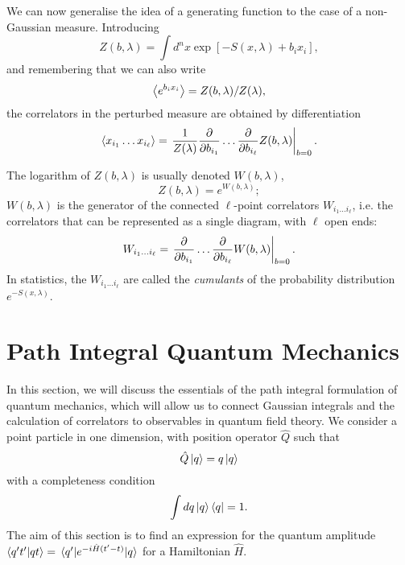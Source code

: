 \documentclass{article}
\numberwithin{equation}{section}
\begin{document}
We can now generalise the idea of a generating function to the case of a non-Gaussian measure. Introducing 
\begin{equation}
    Z(b, \lambda) = \int d^nx \exp[-S(x,\lambda) + b_i x_i],
\end{equation}
and remembering that we can also write
\begin{equation}
    \ev{e^{b_i x_i}} = Z(b, \lambda)/Z(\lambda),
\end{equation}
the correlators in the perturbed measure are obtained by differentiation
\begin{equation}
    \ev{x_{i_1} \dots x_{i_\ell}} = \eval{\frac{1}{Z(\lambda)} \pdv{b_{i_1}} \dots \pdv{b_{i_\ell}} Z(b, \lambda)}_{b=0}.
\end{equation}

The logarithm of $Z(b, \lambda)$ is usually denoted $W(b, \lambda)$,
\begin{equation}
    Z(b, \lambda) = e^{W(b,\lambda)};
\end{equation}
$W(b, \lambda)$ is the generator of the connected $\ell$-point correlators $W_{i_1 \dots i_\ell}$, i.e. the correlators that can be represented as a single diagram, with $\ell$ open ends:
\begin{equation}
    W_{i_1 \dots i_\ell} = \eval{\pdv{b_{i_1}} \dots \pdv{b_{i_\ell}} W(b, \lambda)}_{b=0}.
\end{equation}
In statistics, the $W_{i_1 \dots i_\ell}$ are called the \textit{cumulants} of the probability distribution $e^{-S(x, \lambda)}$.

\section{Path Integral Quantum Mechanics}

In this section, we will discuss the essentials of the path integral formulation of quantum mechanics, which will allow us to connect Gaussian integrals and the calculation of correlators to observables in quantum field theory. We consider a point particle in one dimension, with position operator $\hat{Q}$ such that
\begin{equation}
    \hat{Q}\ket{q} = q\ket{q}
\end{equation}
with a completeness condition
\begin{equation}
    \int dq \ket{q} \bra{q} = 1.
\end{equation}
The aim of this section is to find an expression for the quantum amplitude $\braket{q't'}{qt} = \mel{q'}{e^{-i\hat{H}(t'-t)}}{q}$ for a Hamiltonian $\hat{H}$.
\end{document}
